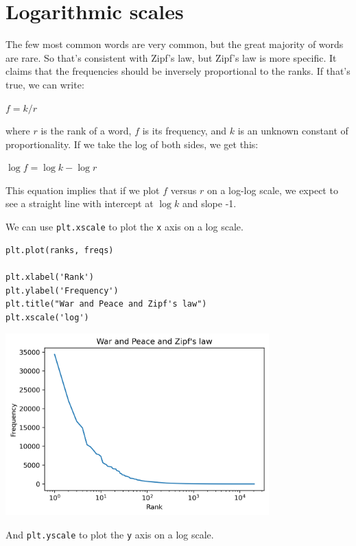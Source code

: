 \hypertarget{logarithmic-scales}{%
\section{Logarithmic scales}\label{logarithmic-scales}}

The few most common words are very common, but the great majority of
words are rare. So that's consistent with Zipf's law, but Zipf's law is
more specific. It claims that the frequencies should be inversely
proportional to the ranks. If that's true, we can write:

\(f = k / r\)

where \(r\) is the rank of a word, \(f\) is its frequency, and \(k\) is
an unknown constant of proportionality. If we take the log of both
sides, we get this:

\(\log f = \log k - \log r\)

This equation implies that if we plot \(f\) versus \(r\) on a log-log
scale, we expect to see a straight line with intercept at \(\log k\) and
slope -1.

We can use \passthrough{\lstinline!plt.xscale!} to plot the
\passthrough{\lstinline!x!} axis on a log scale.

\begin{lstlisting}[]
plt.plot(ranks, freqs)

plt.xlabel('Rank')
plt.ylabel('Frequency')
plt.title("War and Peace and Zipf's law")
plt.xscale('log')
\end{lstlisting}

\begin{center}
\includegraphics[width=4in]{chapters/06_plotting_files/06_plotting_76_0.png}
\end{center}

And \passthrough{\lstinline!plt.yscale!} to plot the
\passthrough{\lstinline!y!} axis on a log scale.

